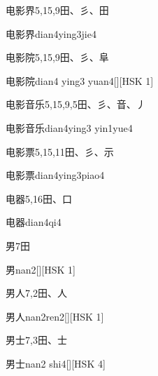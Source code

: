 \begin{entry}{电影界}{5,15,9}{⽥、⼺、⽥}
  \begin{phonetics}{电影界}{dian4ying3jie4}
  \end{phonetics}
\end{entry}

\begin{entry}{电影院}{5,15,9}{⽥、⼺、⾩}
  \begin{phonetics}{电影院}{dian4 ying3 yuan4}[][HSK 1]
  \end{phonetics}
\end{entry}

\begin{entry}{电影音乐}{5,15,9,5}{⽥、⼺、⾳、⼃}
  \begin{phonetics}{电影音乐}{dian4ying3 yin1yue4}
  \end{phonetics}
\end{entry}

\begin{entry}{电影票}{5,15,11}{⽥、⼺、⽰}
  \begin{phonetics}{电影票}{dian4ying3piao4}
  \end{phonetics}
\end{entry}

\begin{entry}{电器}{5,16}{⽥、⼝}
  \begin{phonetics}{电器}{dian4qi4}
  \end{phonetics}
\end{entry}

\begin{entry}{男}{7}{⽥}
  \begin{phonetics}{男}{nan2}[][HSK 1]
  \end{phonetics}
\end{entry}

\begin{entry}{男人}{7,2}{⽥、⼈}
  \begin{phonetics}{男人}{nan2ren2}[][HSK 1]
  \end{phonetics}
\end{entry}

\begin{entry}{男士}{7,3}{⽥、⼠}
  \begin{phonetics}{男士}{nan2 shi4}[][HSK 4]
  \end{phonetics}
\end{entry}

